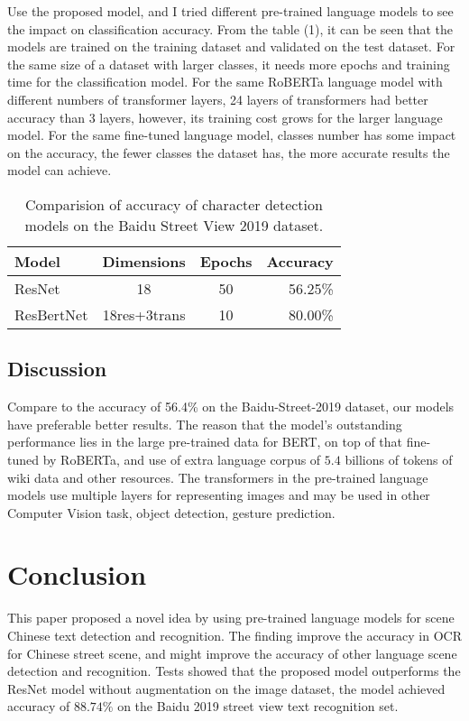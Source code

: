 \documentclass[review]{cvpr}
\begin{document}
Use the proposed model, and I tried different pre-trained language models to see the impact on classification accuracy.
From the table (1), it can be seen that the models are trained on the training dataset and validated on the test dataset.
For the same size of a dataset with larger classes, it needs more epochs and training time for the classification model.
For the same RoBERTa language model with different numbers of transformer layers, 24 layers of transformers had better accuracy than 3 layers,
however, its training cost grows for the larger language model.
For the same fine-tuned language model, classes number has some impact on the accuracy,
the fewer classes the dataset has, the more accurate results the model can achieve.


\begin{table}
\begin{center}
\begin{tabular}{|l|c|c|r|}
\hline
Model & Dimensions & Epochs & Accuracy \\
\hline\hline
ResNet   & 18 & 50	&	56.25\% \\
ResBertNet  & 18res+3trans & 10	&	80.00\% \\
\hline
\end{tabular}
\end{center}
\caption{Comparision of accuracy of character detection models on the Baidu Street View 2019 dataset.}
\end{table}


\subsection{Discussion}

 Compare to the accuracy of 56.4\% on the Baidu-Street-2019 dataset, our models have preferable better results.
The reason that the model's outstanding performance lies in the large pre-trained data for BERT, on top of that fine-tuned by RoBERTa, and use of extra language corpus of
$5.4$ billions of tokens of wiki data and other resources.
The transformers in the pre-trained language models use multiple layers for representing images and may be used in other Computer Vision task, \eg object detection, gesture prediction.


\section{Conclusion}

This paper proposed a novel idea by using pre-trained language models for scene Chinese text detection and recognition.
The finding improve the accuracy in OCR for Chinese street scene, and might improve the accuracy of other language scene detection and recognition.
Tests showed that the proposed model outperforms the ResNet model without augmentation on the image dataset,
the model achieved accuracy of $88.74\%$ on the Baidu 2019 street view text recognition set.
\end{document}
